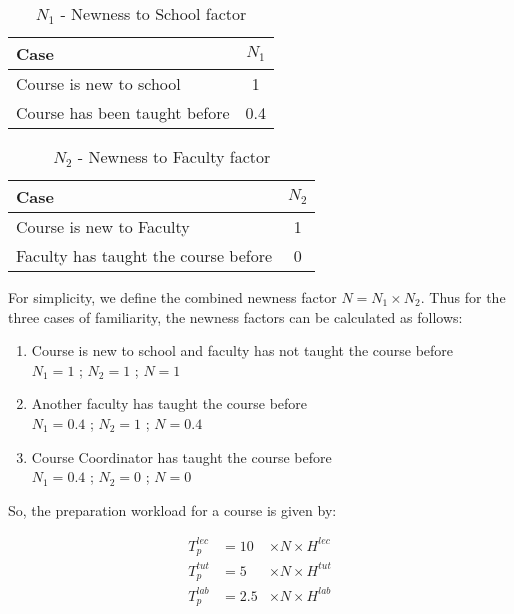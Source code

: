 \begin{table}[ht]
  \centering
  \begin{tabular}{|l|c|}
    \hline
    \textbf{Case}                 & \textbf{\(N_1\)} \\ \hline
    Course is new to school       & 1                \\ \hline
    Course has been taught before & 0.4              \\ \hline
  \end{tabular}
  \caption{\(N_1\) - Newness to School factor}
  \label{tab:n1-workload-factor}
\end{table}

\begin{table}[ht]
  \centering
  \begin{tabular}{|l|c|}
    \hline
    \textbf{Case}                        & \textbf{\(N_2\)} \\ \hline
    Course is new to Faculty             & 1                \\ \hline
    Faculty has taught the course before & 0                \\ \hline
  \end{tabular}
  \caption{\(N_2\) - Newness to Faculty factor}
  \label{tab:n2-workload-factor}
\end{table}

For simplicity, we define the combined newness factor \(N = N_1 \times N_2\). Thus for the three cases of familiarity, the newness factors can be calculated as follows:

\begin{enumerate}
  \item Course is new to school and faculty has not taught the course before       \\
        \(N_1 = 1\) ; \(N_2 = 1\) ; \(N = 1\)
  \item Another faculty has taught the course before \\
        \(N_1 = 0.4\) ; \(N_2 = 1\) ; \(N = 0.4\)
  \item Course Coordinator has taught the course before     \\
        \(N_1 = 0.4\) ; \(N_2 = 0\) ; \(N = 0\)
\end{enumerate}

So, the preparation workload for a course is given by:

\begin{equation}
  \begin{aligned}
    T_p^{lec} & = 10  & \times N \times H^{lec} \\
    T_p^{tut} & = 5   & \times N \times H^{tut} \\
    T_p^{lab} & = 2.5 & \times N \times H^{lab}
  \end{aligned}
\end{equation}

